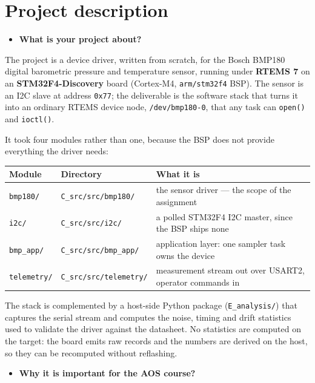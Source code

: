 \documentclass[10pt,a4]{article}
\begin{document}
\section{Project description}

\begin{itemize}
\item \textbf{What is your project about?}
\end{itemize}

The project is a device driver, written from scratch, for the Bosch BMP180
digital barometric pressure and temperature sensor, running under
\textbf{RTEMS 7} on an \textbf{STM32F4-Discovery} board (Cortex-M4,
\texttt{arm/stm32f4} BSP). The sensor is an I2C slave at address \texttt{0x77};
the deliverable is the software stack that turns it into an ordinary RTEMS
device node, \texttt{/dev/bmp180-0}, that any task can \texttt{open()} and
\texttt{ioctl()}.

It took four modules rather than one, because the BSP does not provide
everything the driver needs:

\begin{center}
\begin{tabular}{lll}
Module & Directory & What it is \\
\hline
\texttt{bmp180/} & \texttt{C\_src/src/bmp180/} & the sensor driver --- the scope of the assignment \\
\texttt{i2c/} & \texttt{C\_src/src/i2c/} & a polled STM32F4 I2C master, since the BSP ships none \\
\texttt{bmp\_app/} & \texttt{C\_src/src/bmp\_app/} & application layer: one sampler task owns the device \\
\texttt{telemetry/} & \texttt{C\_src/src/telemetry/} & measurement stream out over USART2, operator commands in \\
\end{tabular}
\end{center}

The stack is complemented by a host-side Python package
(\texttt{E\_analysis/}) that captures the serial stream and computes the noise,
timing and drift statistics used to validate the driver against the datasheet.
No statistics are computed on the target: the board emits raw records and the
numbers are derived on the host, so they can be recomputed without reflashing.

\begin{itemize}
\item \textbf{Why it is important for the AOS course?}
\end{itemize}
\end{document}

